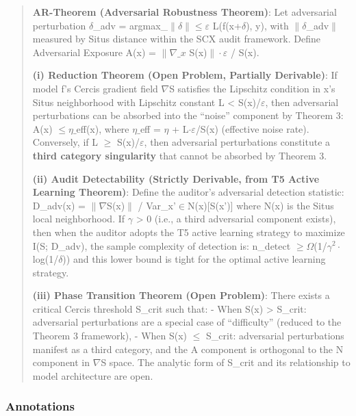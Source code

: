 \documentclass[
  12pt,
]{article}
\begin{document}
\begin{quote}
\textbf{AR-Theorem (Adversarial Robustness Theorem)}: Let adversarial perturbation $\delta$\_adv = argmax\_{$\|\delta\|\leq\varepsilon$} L(f(x+$\delta$), y), with $\|\delta$\_adv$\|$ measured by Situs distance within the SCX audit framework. Define Adversarial Exposure A(x) = $\|\nabla\_x$ S(x)$\| \cdot \varepsilon$ / S(x).

\textbf{(i) Reduction Theorem (Open Problem, Partially Derivable)}: If model f's Cercis gradient field $\nabla$S satisfies the Lipschitz condition in x's Situs neighborhood with Lipschitz constant L < S(x)/$\varepsilon$, then adversarial perturbations can be absorbed into the ``noise'' component by Theorem 3: A(x) $\leq \eta\_$eff(x), where $\eta\_$eff = $\eta$ + L$\cdot\varepsilon$/S(x) (effective noise rate). Conversely, if L $\geq$ S(x)/$\varepsilon$, then adversarial perturbations constitute a \textbf{third category singularity} that cannot be absorbed by Theorem 3.

\textbf{(ii) Audit Detectability (Strictly Derivable, from T5 Active Learning Theorem)}: Define the auditor's adversarial detection statistic: D\_adv(x) = $\|\nabla$S(x)$\|$ / Var\_{x'$\in$N(x)}[S(x')] where N(x) is the Situs local neighborhood. If $\gamma$ > 0 (i.e., a third adversarial component exists), then when the auditor adopts the T5 active learning strategy to maximize I(S; D\_adv), the sample complexity of detection is: n\_detect $\geq \Omega$(1/$\gamma^2 \cdot$ log(1/$\delta$)) and this lower bound is tight for the optimal active learning strategy.

\textbf{(iii) Phase Transition Theorem (Open Problem)}: There exists a critical Cercis threshold S\_crit such that: - When S(x) > S\_crit: adversarial perturbations are a special case of ``difficulty'' (reduced to the Theorem 3 framework), - When S(x) $\leq$ S\_crit: adversarial perturbations manifest as a third category, and the A component is orthogonal to the N component in $\nabla$S space. The analytic form of S\_crit and its relationship to model architecture are open.
\end{quote}

\subsubsection{Annotations}\label{ar-annotations}
\end{document}

